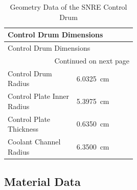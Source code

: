\documentclass[8pt,a4paper]{article}
\begin{document}
\begin{longtable}{|m{0.3\linewidth}|m{0.2\linewidth}|}
    \caption{Geometry Data of the SNRE Control Drum} \\
    
    \hline \multicolumn{2}{|l|}{{Control Drum Dimensions}} \\ \hline 
    \endfirsthead
    
    
    \hline \multicolumn{2}{|l|}{{Control Drum Dimensions}} \\ \hline 
    \endhead
    
    \hline \multicolumn{2}{|r|}{{Continued on next page}} \\ \hline
    \endfoot
    
    \hline
    \endlastfoot
    Control Drum Radius & \SI{6.0325}{cm}\\
    Control Plate Inner Radius & \SI{5.3975}{cm}\\
    Control Plate Thickness & \SI{0.6350}{cm}\\
    Coolant Channel Radius & \SI{6.3500}{cm}\\
\end{longtable}

\pagebreak

\subsection*{Material Data}
\end{document}

